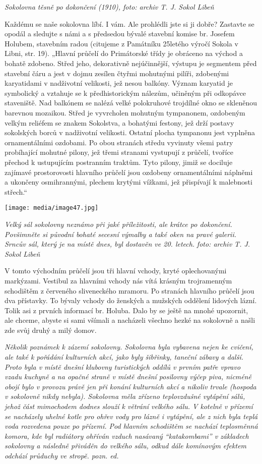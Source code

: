 \emph{Sokolovna těsně po dokončení (1910), foto: archiv T. J. Sokol
Libeň}

Každému se naše sokolovna líbí. I vám. Ale prohlédli jste si ji dobře?
Zastavte se opodál a sledujte s námi a s předsedou bývalé stavební
komise br. Josefem Holubem, stavebním radou (citujeme z Památníku
25letého výročí Sokola v Libni, str. 19). „Hlavní průčelí do Primátorské
třídy je obráceno na východ a bohatě zdobeno. Střed jeho, dekorativně
nejúčinnější, výstupu je segmentem před stavební čáru a jest v dojmu
zesílen čtyřmi mohutnými pilíři, zdobenými karyatidami v nadživotní
velikosti, jež nesou balkóny. Význam karyatid je symbolický a vztahuje
se k předhistorickým nálezům, učiněným při odkopávce staveniště. Nad
balkónem se nalézá velké polokruhové trojdílné okno se skleněnou
barevnou mozaikou. Střed je vyvrcholen mohutným tympanonem, ozdobeným
velkým reliéfem se znakem Sokolstva, a bohatými festony, jež drží
postavy sokolských borců v nadživotní velikosti. Ostatní plocha
tympanonu jest vyplněna ornamentálními ozdobami. Po obou stranách středu
vyvinuty všemi patry probíhající mohutné pilony, jež třemi stranami
vystupují z průčelí, tvoříce přechod k ustupujícím postranním traktům.
Tyto pilony, jimiž se dociluje zajímavé prostorovosti hlavního průčelí
jsou ozdobeny ornamentálními náplněmi a ukončeny osmihrannými, plechem
krytými vížkami, jež přispívají k malebnosti střech.``

\texttt{[image: media/image47.jpg]}

\emph{Velký sál sokolovny neznámo při jaké příležitosti, ale krátce po
dokončení. Povšimněte si původní bohaté secesní výmalby a také oken na
pravé galerii. Srncův sál, který je na místě dnes, byl dostavěn ve 20.
letech.} \emph{foto: archiv T. J. Sokol Libeň}

V tomto východním průčelí jsou tři hlavní vchody, kryté oplechovanými
markýzami. Vestibul za hlavními vchody nás vítá krásným trojramenným
schodištěm z červeného sliveneckého mramoru. Po stranách hlavního
průčelí jsou dva přístavky. To bývaly vchody do ženských a mužských
oddělení lidových lázní. \textquotesingle Tolik asi z prvních informací
br. Holuba. Dalo by se ještě na mnohé upozornit, ale chceme, abyste si
sami všímali a nacházeli všechno hezké na sokolovně a našli zde svůj
druhý a milý domov.

\emph{Několik poznámek k zázemí sokolovny. Sokolovna byla vybavena nejen
ke cvičení, ale také k pořádání kulturních akcí, jako byly šibřinky,
taneční zábavy a další. Proto byla v místě dnešní klubovny turistických
oddílů v prvním patře vpravo vzadu kuchyně a na opačné straně v místě
dnešní posilovny výčep piva, nicméně obojí bylo v provozu právě jen při
konání kulturních akcí a nikoliv trvale (hospoda v sokolovně nikdy
nebyla). Sokolovna měla zřízeno teplovzdušné vytápění sálů, jehož část
mimochodem dodnes slouží k větrání velkého sálu. V kotelně v přízemí se
nacházely uhelné kotle pro ohřev vody pro lázně i vytápění, ale z nich
byla teplá voda rozvedena pouze po přízemí. Pod hlavním schodištěm se
nachází teplosměnná komora, kde byl radiátory ohříván vzduch nasávaný
``katakombami'' v základech sokolovny a následně přiváděn do velkého
sálu, odkud dále komínovým efektem odchází průduchy ve stropě. pozn.
ed.}

